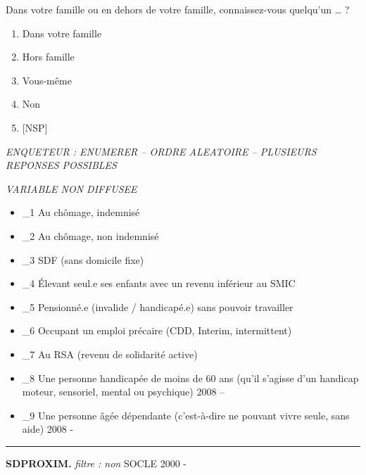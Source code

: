 \documentclass[12pt,a4paper]{reedthesis}
\providecommand{\tightlist}{%
  \setlength{\itemsep}{0pt}\setlength{\parskip}{0pt}}
\begin{document}
Dans votre famille ou en dehors de votre famille, connaissez-vous quelqu'un \ldots{} ?
\begin{enumerate}
\def\labelenumi{\arabic{enumi}.}
\tightlist
\item
  Dans votre famille
\item
  Hors famille
\item
  Vous-même
\item
  Non
\item
  {[}NSP{]}
\end{enumerate}
\emph{ENQUETEUR : ENUMERER -- ORDRE ALEATOIRE -- PLUSIEURS REPONSES POSSIBLES}

\emph{VARIABLE NON DIFFUSEE}
\begin{itemize}
\tightlist
\item
  \_1 Au chômage, indemnisé
\item
  \_2 Au chômage, non indemnisé
\item
  \_3 SDF (sans domicile fixe)
\item
  \_4 Élevant seul.e ses enfants avec un revenu inférieur au SMIC
\item
  \_5 Pensionné.e (invalide / handicapé.e) sans pouvoir travailler
\item
  \_6 Occupant un emploi précaire (CDD, Interim, intermittent)
\item
  \_7 Au RSA (revenu de solidarité active)
\item
  \_8 Une personne handicapée de moins de 60 ans (qu'il s'agisse d'un handicap moteur, sensoriel, mental ou psychique) 2008 --
\item
  \_9 Une personne âgée dépendante (c'est-à-dire ne pouvant vivre seule, sans aide) 2008 -
\end{itemize}
\begin{center}\rule{0.5\linewidth}{0.5pt}\end{center}

\textbf{SDPROXIM.} \emph{filtre : non} SOCLE 2000 -
\end{document}
